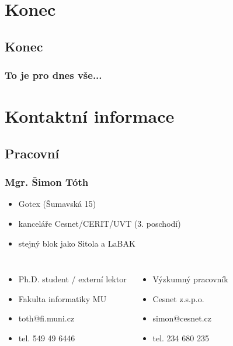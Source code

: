 \section*{Konec}
\subsection*{Konec}

\begin{frame}
	\frametitle{To je pro dnes vše...}
\end{frame}

\section*{Kontaktní informace}
	\subsection*{Pracovní}

\begin{frame}[label=kontakt-simontoth]
	\frametitle{Mgr. Šimon Tóth}
	\begin{itemize}
		\item{Gotex (Šumavská 15)}
		\item{kanceláře Cesnet/CERIT/UVT (3. poschodí)}
		\item{stejný blok jako Sitola a LaBAK}
	\end{itemize}
	
	\begin{center}
	\begin{columns}

		\begin{itemize}
			\item{Ph.D. student / externí lektor}
			\item{Fakulta informatiky MU}
			\item{toth@fi.muni.cz}
			\item{tel. 549 49 6446}
		\end{itemize}

		\begin{itemize}
			\item{Výzkumný pracovník}
			\item{Cesnet z.s.p.o.}
			\item{simon@cesnet.cz}
			\item{tel. 234 680 235}
		\end{itemize}

	\end{columns}
	\end{center}

\end{frame}

%


